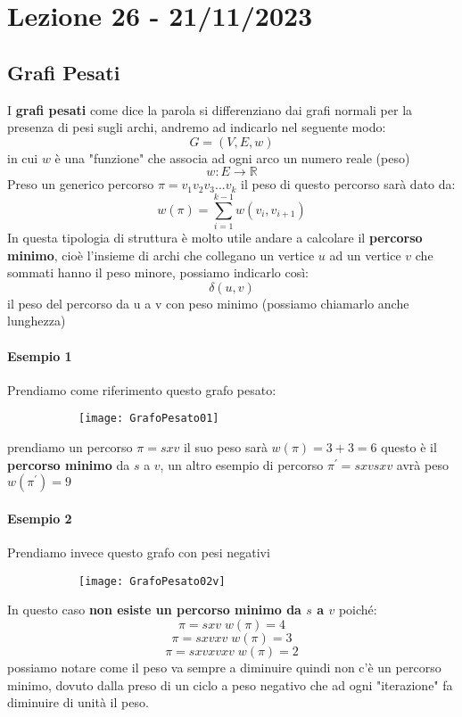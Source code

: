 \section{Lezione 26 - 21/11/2023}
\subsection{Grafi Pesati}
I \textbf{grafi pesati} come dice la parola si differenziano dai grafi normali per la presenza di pesi sugli archi, andremo ad indicarlo nel seguente modo:
$$ G=(V,E,w)$$
in cui $w$ è una "funzione" che associa ad ogni arco un numero reale (peso)
$$ w: E \rightarrow \mathbb{R}$$
Preso un generico percorso $\pi=v_1v_2v_3...v_k$ il peso di questo percorso sarà dato da:
$$ w(\pi)=\sum_{i=1}^{k-1} w(v_i,v_{i+1})$$
In questa tipologia di struttura è molto utile andare a calcolare il \textbf{percorso minimo}, cioè l'insieme di archi che collegano un vertice $u$ ad un vertice $v$ che sommati hanno il peso minore, possiamo indicarlo così:
$$ \delta(u,v)$$ 
il peso del percorso da u a v con peso minimo (possiamo chiamarlo anche lunghezza)

\paragraph{Esempio 1} Prendiamo come riferimento questo grafo pesato:
\begin{figure}[H]
	\centering
	\begin{subfigure}[b]{0.25\textwidth}
		\texttt{[image: GrafoPesato01]} 
	\end{subfigure}
\end{figure} 
prendiamo un percorso $\pi=sxv$ il suo peso sarà $w(\pi)=3+3=6$ questo è il \textbf{percorso minimo} da $s$ a $v$, un altro esempio di percorso $\pi^{\prime}=sxvsxv$ avrà peso $w(\pi^{\prime}) = 9$

\paragraph{Esempio 2} Prendiamo invece questo grafo con pesi negativi
\begin{figure}[H]
	\centering
	\begin{subfigure}[b]{0.25\textwidth}
		\texttt{[image: GrafoPesato02v]} 
	\end{subfigure}
\end{figure} 
In questo caso \textbf{non esiste un percorso minimo da $s$ a $v$} poiché:
$$ \pi=sxv \; w(\pi) = 4$$
$$ \pi=sxvxv \; w(\pi) = 3$$
$$ \pi=sxvxvxv \; w(\pi) = 2$$
possiamo notare come il peso va sempre a diminuire quindi non c'è un percorso minimo, dovuto dalla preso di un ciclo a peso negativo che ad ogni "iterazione" fa diminuire di unità il peso.\bigskip

